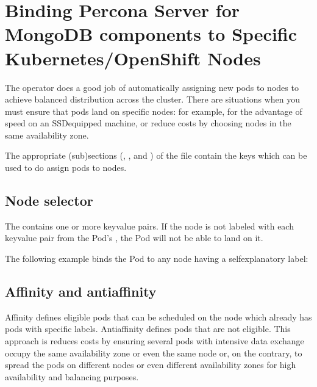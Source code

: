 \documentclass[letterpaper,10pt,english]{sphinxmanual}
\begin{document}
\chapter{Binding Percona Server for MongoDB components to Specific Kubernetes/OpenShift Nodes}
\label{\detokenize{constraints:binding-percona-server-for-mongodb-components-to-specific-kubernetes-openshift-nodes}}\label{\detokenize{constraints::doc}}
The operator does a good job of automatically assigning new pods to nodes to achieve balanced distribution across the cluster.
There are situations when you must ensure that pods land
on specific nodes: for example, for the advantage of speed on an SSD\sphinxhyphen{}equipped machine, or reduce costs by choosing nodes in the same
availability zone.

The appropriate (sub)sections (, , and
) of the
file contain the keys which can be used to do assign pods to nodes.


\section{Node selector}
\label{\detokenize{constraints:node-selector}}
The  contains one or more key\sphinxhyphen{}value pairs. If the node is
not labeled with each key\sphinxhyphen{}value pair from the Pod’s ,
the Pod will not be able to land on it.

The following example binds the Pod to any node having a
self\sphinxhyphen{}explanatory  label:

\begin{sphinxVerbatim}[commandchars=\\\{\}]
   
\end{sphinxVerbatim}


\section{Affinity and anti\sphinxhyphen{}affinity}
\label{\detokenize{constraints:affinity-and-anti-affinity}}
Affinity defines eligible pods that can be scheduled on the node which already has pods with specific labels. Anti\sphinxhyphen{}affinity defines pods that are not eligible. This approach is reduces costs by ensuring several pods with intensive data exchange  occupy the
same availability zone or even the same node or, on the contrary, to
spread the pods on different nodes or even different availability zones
for high availability and balancing purposes.
\end{document}

